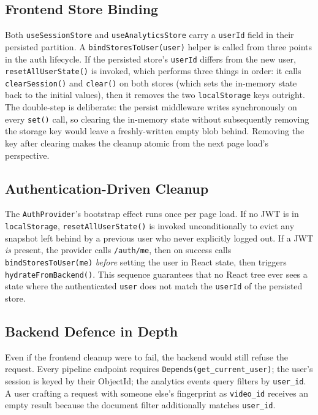 \documentclass[conference]{IEEEtran}
\begin{document}
\subsection{Frontend Store Binding}

Both \texttt{useSessionStore} and \texttt{useAnalyticsStore} carry a \texttt{userId} field in their persisted partition. A \texttt{bindStoresToUser(user)} helper is called from three points in the auth lifecycle. If the persisted store's \texttt{userId} differs from the new user, \texttt{resetAllUserState()} is invoked, which performs three things in order: it calls \texttt{clearSession()} and \texttt{clear()} on both stores (which sets the in-memory state back to the initial values), then it removes the two \texttt{localStorage} keys outright. The double-step is deliberate: the persist middleware writes synchronously on every \texttt{set()} call, so clearing the in-memory state without subsequently removing the storage key would leave a freshly-written empty blob behind. Removing the key after clearing makes the cleanup atomic from the next page load's perspective.

\subsection{Authentication-Driven Cleanup}

The \texttt{AuthProvider}'s bootstrap effect runs once per page load. If no JWT is in \texttt{localStorage}, \texttt{resetAllUserState()} is invoked unconditionally to evict any snapshot left behind by a previous user who never explicitly logged out. If a JWT \textit{is} present, the provider calls \texttt{/auth/me}, then on success calls \texttt{bindStoresToUser(me)} \textit{before} setting the user in React state, then triggers \texttt{hydrateFromBackend()}. This sequence guarantees that no React tree ever sees a state where the authenticated \texttt{user} does not match the \texttt{userId} of the persisted store.

\subsection{Backend Defence in Depth}

Even if the frontend cleanup were to fail, the backend would still refuse the request. Every pipeline endpoint requires \texttt{Depends(get\_current\_user)}; the user's session is keyed by their ObjectId; the analytics events query filters by \texttt{user\_id}. A user crafting a request with someone else's fingerprint as \texttt{video\_id} receives an empty result because the document filter additionally matches \texttt{user\_id}.
\end{document}
